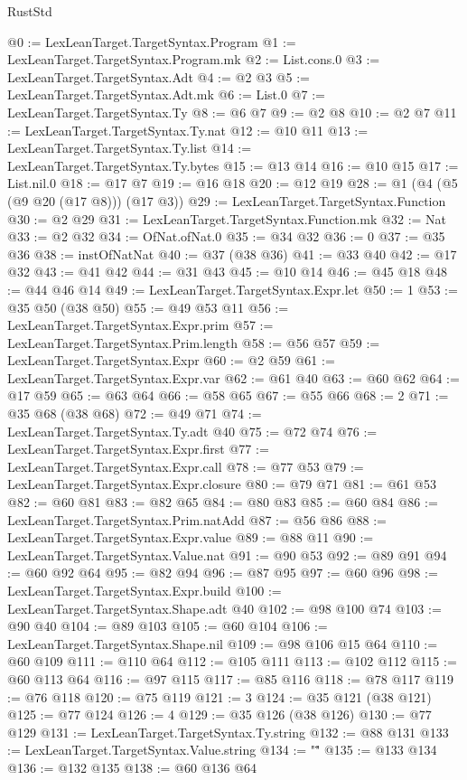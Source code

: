 \begin{lexlean}{RustStd}
\begin{coremodule}
{\begin{coremodule}
{{{{{{{{{{{{{{{{{{{{{{{{{{{{{{{{@0 := LexLeanTarget.TargetSyntax.Program
@1 := LexLeanTarget.TargetSyntax.Program.mk
@2 := List.cons.{0}
@3 := LexLeanTarget.TargetSyntax.Adt
@4 := @2 @3
@5 := LexLeanTarget.TargetSyntax.Adt.mk
@6 := List.{0}
@7 := LexLeanTarget.TargetSyntax.Ty
@8 := @6 @7
@9 := @2 @8
@10 := @2 @7
@11 := LexLeanTarget.TargetSyntax.Ty.nat
@12 := @10 @11
@13 := LexLeanTarget.TargetSyntax.Ty.list
@14 := LexLeanTarget.TargetSyntax.Ty.bytes
@15 := @13 @14
@16 := @10 @15
@17 := List.nil.{0}
@18 := @17 @7
@19 := @16 @18
@20 := @12 @19
@28 := @1 (@4 (@5 (@9 @20 (@17 @8))) (@17 @3))
@29 := LexLeanTarget.TargetSyntax.Function
@30 := @2 @29
@31 := LexLeanTarget.TargetSyntax.Function.mk
@32 := Nat
@33 := @2 @32
@34 := OfNat.ofNat.{0}
@35 := @34 @32
@36 := 0
@37 := @35 @36
@38 := instOfNatNat
@40 := @37 (@38 @36)
@41 := @33 @40
@42 := @17 @32
@43 := @41 @42
@44 := @31 @43
@45 := @10 @14
@46 := @45 @18
@48 := @44 @46 @14
@49 := LexLeanTarget.TargetSyntax.Expr.let
@50 := 1
@53 := @35 @50 (@38 @50)
@55 := @49 @53 @11
@56 := LexLeanTarget.TargetSyntax.Expr.prim
@57 := LexLeanTarget.TargetSyntax.Prim.length
@58 := @56 @57
@59 := LexLeanTarget.TargetSyntax.Expr
@60 := @2 @59
@61 := LexLeanTarget.TargetSyntax.Expr.var
@62 := @61 @40
@63 := @60 @62
@64 := @17 @59
@65 := @63 @64
@66 := @58 @65
@67 := @55 @66
@68 := 2
@71 := @35 @68 (@38 @68)
@72 := @49 @71
@74 := LexLeanTarget.TargetSyntax.Ty.adt @40
@75 := @72 @74
@76 := LexLeanTarget.TargetSyntax.Expr.first
@77 := LexLeanTarget.TargetSyntax.Expr.call
@78 := @77 @53
@79 := LexLeanTarget.TargetSyntax.Expr.closure
@80 := @79 @71
@81 := @61 @53
@82 := @60 @81
@83 := @82 @65
@84 := @80 @83
@85 := @60 @84
@86 := LexLeanTarget.TargetSyntax.Prim.natAdd
@87 := @56 @86
@88 := LexLeanTarget.TargetSyntax.Expr.value
@89 := @88 @11
@90 := LexLeanTarget.TargetSyntax.Value.nat
@91 := @90 @53
@92 := @89 @91
@94 := @60 @92 @64
@95 := @82 @94
@96 := @87 @95
@97 := @60 @96
@98 := LexLeanTarget.TargetSyntax.Expr.build
@100 := LexLeanTarget.TargetSyntax.Shape.adt @40
@102 := @98 @100 @74
@103 := @90 @40
@104 := @89 @103
@105 := @60 @104
@106 := LexLeanTarget.TargetSyntax.Shape.nil
@109 := @98 @106 @15 @64
@110 := @60 @109
@111 := @110 @64
@112 := @105 @111
@113 := @102 @112
@115 := @60 @113 @64
@116 := @97 @115
@117 := @85 @116
@118 := @78 @117
@119 := @76 @118
@120 := @75 @119
@121 := 3
@124 := @35 @121 (@38 @121)
@125 := @77 @124
@126 := 4
@129 := @35 @126 (@38 @126)
@130 := @77 @129
@131 := LexLeanTarget.TargetSyntax.Ty.string
@132 := @88 @131
@133 := LexLeanTarget.TargetSyntax.Value.string
@134 := "\""
@135 := @133 @134
@136 := @132 @135
@138 := @60 @136 @64
}}}}}}}}}}}}}}}}}}}}}}}}}}}}}}}}
\end{coremodule}}
\end{coremodule}
\end{lexlean}

